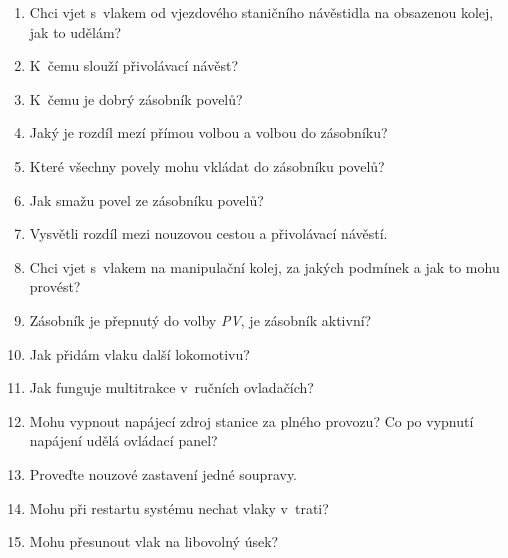 \documentclass[12pt,a4paper]{article}
\begin{document}
\begin{enumerate}[leftmargin=*]
\item Chci vjet s~vlakem od vjezdového staničního návěstidla na obsazenou
kolej, jak to udělám?

\item K~čemu slouží přivolávací návěst?

\item K~čemu je dobrý zásobník povelů?

\item Jaký je rozdíl mezí přímou volbou a volbou do zásobníku?

\item Které všechny povely mohu vkládat do zásobníku povelů?

\item Jak smažu povel ze zásobníku povelů?

\item Vysvětli rozdíl mezi nouzovou cestou a přivolávací návěstí.

\item Chci vjet s~vlakem na manipulační kolej, za jakých podmínek a jak to mohu
provést?

\item Zásobník je přepnutý do volby \textit{PV}, je zásobník aktivní?

\item Jak přidám vlaku další lokomotivu?

\item Jak funguje multitrakce v~ručních ovladačích?

\item Mohu vypnout napájecí zdroj stanice za plného provozu? Co po vypnutí
napájení udělá ovládací panel?

\item Proveďte nouzové zastavení jedné soupravy.

\item Mohu při restartu systému nechat vlaky v~trati?

\item Mohu přesunout vlak na libovolný úsek?

\end{enumerate}
\end{document}
